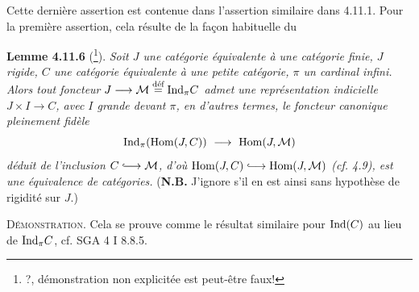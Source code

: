 Cette dernière assertion est contenue dans l'assertion similaire dans 4.11.1. Pour la première assertion, cela résulte de la façon habituelle du

\textbf{Lemme 4.11.6} (\footnote{?, démonstration non explicitée est peut-être faux!}). \textit{Soit $J$ une catégorie équivalente à une catégorie finie, $J$ rigide, $C$ une catégorie équivalente à une petite catégorie, $\pi$ un cardinal infini. Alors tout foncteur}
\textit{$J \longrightarrow \mathcal{M} \defeq \Ind_\pi C$ admet une représentation indicielle $J \times I \longrightarrow C$, avec $I$ grande devant $\pi$, en d'autres termes, le}  \textit{foncteur canonique pleinement fidèle}
\[
\Ind_\pi(\Hom(J,C)) \ \longrightarrow \ \Hom(J,\mathcal{M})
\]
\textit{déduit de l'inclusion $C \into \mathcal{M}$, d'où $\Hom(J,C) \into \Hom(J,\mathcal{M})$ (cf. 4.9), est une équivalence de catégories.} (\textbf{N.B.} J'ignore s'il en est ainsi sans hypothèse de rigidité sur $J$.)

\textsc{Démonstration}. Cela se prouve comme le résultat similaire pour $\Ind(C)$ au lieu de $\Ind_\pi C$, cf. SGA 4 I 8.8.5.


